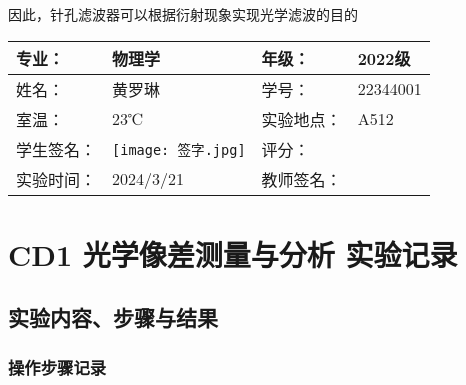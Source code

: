 \documentclass[dvipsnames, svgnames,a4paper,11pt]{article}
\begin{document}
因此，针孔滤波器可以根据衍射现象实现光学滤波的目的
	
	
	
	\clearpage
	
	\begin{table}
		\renewcommand\arraystretch{1.7}
		\centering
		\begin{tabularx}{\textwidth}{|X|X|X|X|}
			\hline
			专业： & 物理学 & 年级： & 2022级 \\
			\hline
			姓名： & 黄罗琳 & 学号： &22344001 \\
			\hline
			室温： & 23℃ & 实验地点： & A512 \\
			\hline
			学生签名：& \texttt{[image: 签字.jpg]} & 评分： &\\
			\hline
			实验时间：& 2024/3/21 & 教师签名：&\\
			\hline
		\end{tabularx}
	\end{table}
	
	\section{CD1 光学像差测量与分析 \quad\heiti 实验记录}
	
	\subsection{实验内容、步骤与结果}
	
	\subsubsection{操作步骤记录}
	
\end{document}
